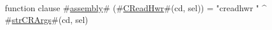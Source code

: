 function clause #\hyperref[sailMIPSzassembly]{assembly}# (#\hyperref[sailMIPSzCReadHwr]{CReadHwr}#(cd, sel)) = "creadhwr " ^ #\hyperref[sailMIPSzstrCRArgs]{strCRArgs}#(cd, sel)
